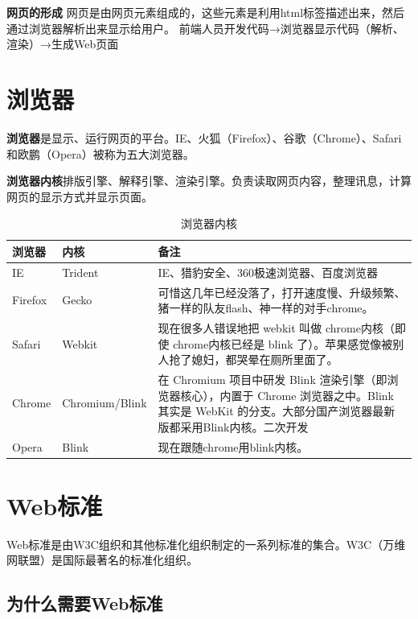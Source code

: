 \documentclass[
]{book}
\begin{document}
\textbf{网页的形成}
网页是由网页元素组成的，这些元素是利用html标签描述出来，然后通过浏览器解析出来显示给用户。
前端人员开发代码→浏览器显示代码（解析、渲染）→生成Web页面

\hypertarget{ux6d4fux89c8ux5668}{%
\section{浏览器}\label{ux6d4fux89c8ux5668}}

\textbf{浏览器}是显示、运行网页的平台。IE、火狐（Firefox）、谷歌（Chrome）、Safari和欧鹏（Opera）被称为五大浏览器。

\textbf{浏览器内核}排版引擎、解释引擎、渲染引擎。负责读取网页内容，整理讯息，计算网页的显示方式并显示页面。

\begin{table}

\caption{\label{tab:unnamed-chunk-1}浏览器内核}
\centering
\begin{tabular}[t]{lll}
\toprule
浏览器 & 内核 & 备注\\
\midrule
IE & Trident & IE、猎豹安全、360极速浏览器、百度浏览器\\
Firefox & Gecko & 可惜这几年已经没落了，打开速度慢、升级频繁、猪一样的队友flash、神一样的对手chrome。\\
Safari & Webkit & 现在很多人错误地把 webkit 叫做 chrome内核（即使 chrome内核已经是 blink 了）。苹果感觉像被别人抢了媳妇，都哭晕在厕所里面了。\\
Chrome & Chromium/Blink & 在 Chromium 项目中研发 Blink 渲染引擎（即浏览器核心），内置于 Chrome 浏览器之中。Blink 其实是 WebKit 的分支。大部分国产浏览器最新版都采用Blink内核。二次开发\\
Opera & Blink & 现在跟随chrome用blink内核。\\
\bottomrule
\end{tabular}
\end{table}

\hypertarget{webux6807ux51c6}{%
\section{Web标准}\label{webux6807ux51c6}}

Web标准是由W3C组织和其他标准化组织制定的一系列标准的集合。W3C（万维网联盟）是国际最著名的标准化组织。

\hypertarget{ux4e3aux4ec0ux4e48ux9700ux8981webux6807ux51c6}{%
\subsection{为什么需要Web标准}\label{ux4e3aux4ec0ux4e48ux9700ux8981webux6807ux51c6}}
\end{document}
